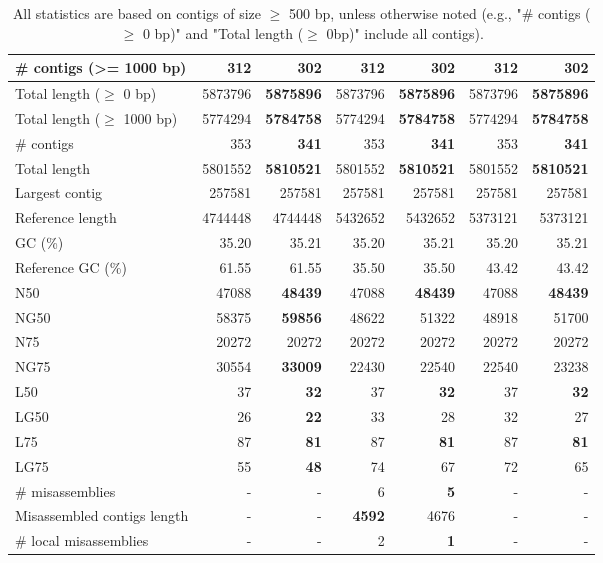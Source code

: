 \documentclass[12pt,a4paper]{article}
\begin{document}
\begin{table}[ht]
\begin{center}
\caption{All statistics are based on contigs of size $\geq$ 500 bp, unless otherwise noted (e.g., "\# contigs ($\geq$ 0 bp)" and "Total length ($\geq$ 0bp)" include all contigs).}
\begin{tabular}{|l*{6}{|r}|}
\hline
# contigs (>= 1000 bp) & 312 & 302 & 312 & 302 & 312 & 302 \\ \hline
Total length ($\geq$ 0 bp) & 5873796 & {\bf 5875896} & 5873796 & {\bf 5875896} & 5873796 & {\bf 5875896} \\ \hline
Total length ($\geq$ 1000 bp) & 5774294 & {\bf 5784758} & 5774294 & {\bf 5784758} & 5774294 & {\bf 5784758} \\ \hline
\# contigs & 353 & {\bf 341} & 353 & {\bf 341} & 353 & {\bf 341} \\ \hline
Total length & 5801552 & {\bf 5810521} & 5801552 & {\bf 5810521} & 5801552 & {\bf 5810521} \\ \hline
Largest contig & 257581 & 257581 & 257581 & 257581 & 257581 & 257581 \\ \hline
Reference length & 4744448 & 4744448 & 5432652 & 5432652 & 5373121 & 5373121 \\ \hline
GC (\%) & 35.20 & 35.21 & 35.20 & 35.21 & 35.20 & 35.21 \\ \hline
Reference GC (\%) & 61.55 & 61.55 & 35.50 & 35.50 & 43.42 & 43.42 \\ \hline
N50 & 47088 & {\bf 48439} & 47088 & {\bf 48439} & 47088 & {\bf 48439} \\ \hline
NG50 & 58375 & {\bf 59856} & 48622 & 51322 & 48918 & 51700 \\ \hline
N75 & 20272 & 20272 & 20272 & 20272 & 20272 & 20272 \\ \hline
NG75 & 30554 & {\bf 33009} & 22430 & 22540 & 22540 & 23238 \\ \hline
L50 & 37 & {\bf 32} & 37 & {\bf 32} & 37 & {\bf 32} \\ \hline
LG50 & 26 & {\bf 22} & 33 & 28 & 32 & 27 \\ \hline
L75 & 87 & {\bf 81} & 87 & {\bf 81} & 87 & {\bf 81} \\ \hline
LG75 & 55 & {\bf 48} & 74 & 67 & 72 & 65 \\ \hline
\# misassemblies & - & - & 6 & {\bf 5} & - & - \\ \hline
Misassembled contigs length & - & - & {\bf 4592} & 4676 & - & - \\ \hline
\# local misassemblies & - & - & 2 & {\bf 1} & - & - \\ \hline

\end{tabular}
\end{center}
\end{table}
\end{document}

